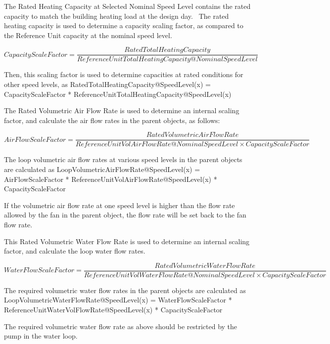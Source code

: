 The Rated Heating Capacity at Selected Nominal Speed Level contains the rated capacity to match the building heating load at the design day.~ The rated heating capacity is used to determine a capacity scaling factor, as compared to the Reference Unit capacity at the nominal speed level.

{\scriptsize
\begin{equation}
CapacityScaleFactor = \frac{{RatedTotalHeatingCapacity}}{{ReferenceUnitTotalHeatingCapacity@NominalSpeedLevel}}
\end{equation}}

Then, this scaling factor is used to determine capacities at rated conditions for other speed levels, as RatedTotalHeatingCapacity@SpeedLevel(x) = CapacityScaleFactor * ReferenceUnitTotalHeatingCapacity@SpeedLevel(x)

The Rated Volumetric Air Flow Rate is used to determine an internal scaling factor, and calculate the air flow rates in the parent objects, as follows:

{\scriptsize
\begin{equation}
AirFlowScaleFactor = \frac{{RatedVolumetricAirFlowRate}}{{ReferenceUnitVolAirFlowRate@NominalSpeedLevel \times CapacityScaleFactor}}
\end{equation}}

The loop volumetric air flow rates at various speed levels in the parent objects are calculated as LoopVolumetricAirFlowRate@SpeedLevel(x) = AirFlowScaleFactor * ReferenceUnitVolAirFlowRate@SpeedLevel(x) * CapacityScaleFactor

If the volumetric air flow rate at one speed level is higher than the flow rate allowed by the fan in the parent object, the flow rate will be set back to the fan flow rate.

This Rated Volumetric Water Flow Rate is used to determine an internal scaling factor, and calculate the loop water flow rates.

{\scriptsize
\begin{equation}
WaterFlowScaleFactor = \frac{{RatedVolumetricWaterFlowRate}}{{ReferenceUnitVolWaterFlowRate@NominalSpeedLevel \times CapacityScaleFactor}}
\end{equation}}

The required volumetric water flow rates in the parent objects are calculated as LoopVolumetricWaterFlowRate@SpeedLevel(x) = WaterFlowScaleFactor * ReferenceUnitWaterVolFlowRate@SpeedLevel(x) * CapacityScaleFactor

The required volumetric water flow rate as above should be restricted by the pump in the water loop.

